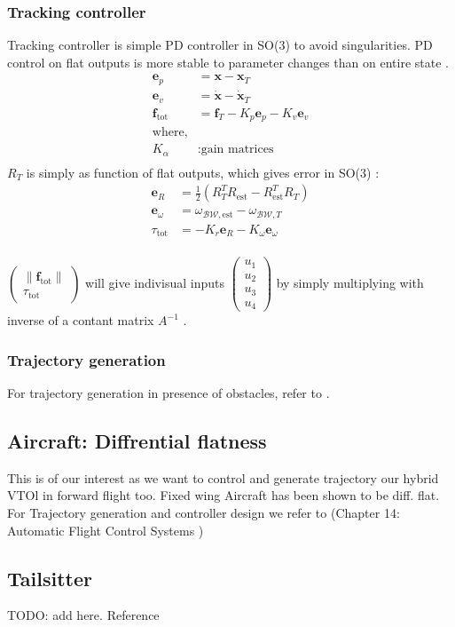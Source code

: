 \subsubsection{Tracking controller}
Tracking controller is simple PD controller in SO(3) to avoid singularities. PD control on flat outputs is more stable to parameter changes than on entire state \cite{Anintrod8:online}.
\begin{align*}
    \mathbf{e}_p &= \mathbf{x} - \mathbf{x}_T \\
    \mathbf{e}_v &= \mathbf{\dot{x}} - \mathbf{\dot{x}}_T \\
    \textbf{f}_\text{tot} &= \textbf{f}_T - K_p \mathbf{e}_p - K_v \mathbf{e}_v \\
    \text{where,} \\
    K_\alpha &: \text{gain matrices} \\
\end{align*}
$R_T$ is simply as function of flat outputs, which gives error in SO(3) \cite{bullo2004geometric}:
\begin{align*}
    \mathbf{e}_R &= \frac{1}{2} (R_T^T R_\text{est} - R_\text{est}^T R_T)\\
    \mathbf{e}_\omega &= \omega_{\mathcal{BW},\text{est}} - \omega_{\mathcal{BW},T}\\
    \tau_\text{tot} &= -K_r \mathbf{e}_R - K_\omega \mathbf{e}_\omega \\
\end{align*}

$\begin{pmatrix} \|\textbf{f}_\text{tot}\| \\ \tau_\text{tot} \end{pmatrix}$ will give indivisual inputs $\begin{pmatrix}u_1\\u_2\\u_3\\u_4\end{pmatrix}$ by simply multiplying with inverse of a contant matrix $A^{-1}$ \cite{mellinger2011minimum}.

\subsubsection{Trajectory generation}

For trajectory generation in presence of obstacles, refer to \cite{mellinger2011minimum}.

\subsection{Aircraft: Diffrential flatness}
This is of our interest as we want to control and generate trajectory our hybrid VTOl in forward flight too. Fixed wing Aircraft has been shown to be diff. flat. For Trajectory generation and controller design we refer to (Chapter 14: Automatic Flight Control Systems \cite{levine2009analysis})

\subsection{Tailsitter}
TODO: add here. Reference 
